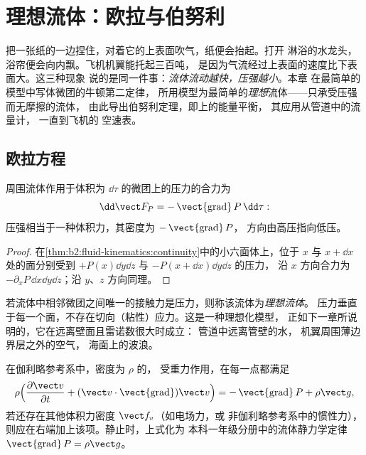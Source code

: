 \chapter{理想流体：欧拉与伯努利}\label{ch:b2:euler-bernoulli}

把一张纸的一边捏住，对着它的上表面吹气，纸便会抬起。打开
淋浴的水龙头，浴帘便会向内飘。飞机机翼能托起三百吨，
是因为气流经过上表面的速度比下表面大。这三种现象
说的是同一件事：\emph{流体流动越快，压强越小}。本章
在最简单的模型中写体微团的牛顿第二定律，
所用模型为最简单的\emph{理想}流体——只承受压强而无摩擦的流体，
由此导出伯努利定理，即上的能量平衡，
其应用从管道中的流量计，
一直到飞机的
空速表。

\section{欧拉方程}

\begin{proposition}[流体微团所受的压力]\label{prop:b2:euler-bernoulli:pressure}
周围流体作用于体积为
$\dd\tau$ 的微团上的压力的合力为
\[
\dd\vect F_P = -\operatorname{\vect{grad}}P\,\dd\tau :
\]
压强相当于一种体积力，其密度为 $-\operatorname{\vect{grad}}P$，
方向由高压指向低压。
\end{proposition}

\begin{proof}
在\cref{thm:b2:fluid-kinematics:continuity}中的小六面体上，位于
$x$ 与 $x + \dd x$ 处的面分别受到 $+P(x)\dd y\dd z$ 与 $-P(x + \dd x)\dd y\dd z$ 的压力，
沿 $x$ 方向合力为 $-\partial_xP\,\dd x\dd y\dd z$；沿 $y$、$z$ 方向同理。
\end{proof}

\begin{definition}[理想流体]\label{def:b2:euler-bernoulli:perfect}
若流体中相邻微团之间唯一的接触力是压力，则称该流体为\emph{理想流体}。
压力垂直于每一个面，不存在切向（粘性）应力。这是一种理想化模型，
正如下一章所说明的，它在远离壁面且雷诺数很大时成立：
管道中远离管壁的水，
机翼周围薄边界层之外的空气，
海面上的波浪。
\end{definition}

\begin{theorem}[欧拉方程]\label{thm:b2:euler-bernoulli:euler}
在伽利略参考系中，密度为 $\rho$ 的，
受重力作用，在每一点都满足
\[
\rho\Bigl(\frac{\partial\vect v}{\partial t} + (\vect v\cdot\operatorname{\vect{grad}})
\vect v\Bigr) = -\operatorname{\vect{grad}}P + \rho\vect g ,
\]
若还存在其他体积力密度 $\vect f_v$（如电场力，或
非伽利略参考系中的惯性力），则应在右端加上该项。静止时，上式化为
本科一年级分册中的流体静力学定律
$\operatorname{\vect{grad}}P = \rho\vect g$。
\end{theorem}

